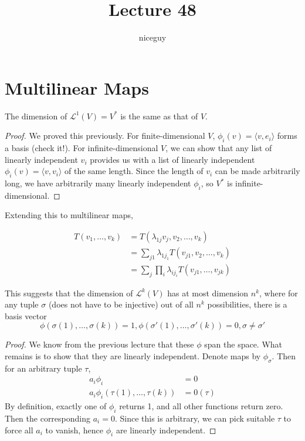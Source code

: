 \documentclass[12pt]{article}
\title{Lecture 48}
\author{niceguy}
\begin{document}
\maketitle

\section{Multilinear Maps}

\begin{lem}
    The dimension of $\mathcal L^1(V) = V^*$ is the same as that of $V$.
\end{lem}

\begin{proof}
    We proved this previously. For finite-dimensional $V$, $\phi_i(v) = \langle v, e_i\rangle$ forms a basis (check it!). For infinite-dimensional $V$, we can show that any list of linearly independent $v_i$ provides us with a list of linearly independent $\phi_i(v) = \langle v, v_i\rangle$ of the same length. Since the length of $v_i$ can be made arbitrarily long, we have arbitrarily many linearly independent $\phi_i$, so $V^*$ is infinite-dimensional.
\end{proof}

Extending this to multilinear maps,

\begin{align*}
    T(v_1,\dots,v_k) &= T(\lambda_{1j}v_j,v_2,\dots,v_k) \\
                     &= \sum_{j1} \lambda_{1j_1} T(v_{j1},v_2,\dots,v_k) \\
                     &= \sum_j \prod_i \lambda_{ij_i} T(v_{j1},\dots,v_{jk})
\end{align*}

This suggests that the dimension of $\mathcal L^k(V)$ has at most dimension $n^k$, where for any tuple $\sigma$ (does not have to be injective) out of all $n^k$ possibilities, there is a basis vector
$$\phi(\sigma(1),\dots,\sigma(k)) = 1, \phi(\sigma'(1),\dots,\sigma'(k)) = 0, \sigma \neq \sigma'$$

\begin{proof}
    We know from the previous lecture that these $\phi$ span the space. What remains is to show that they are linearly independent. Denote maps by $\phi_\sigma$. Then for an arbitrary tuple $\tau$,
    \begin{align*}
        a_i\phi_i &= 0 \\
        a_i\phi_i(\tau(1),\dots,\tau(k)) &= 0(\tau)
    \end{align*}
    By definition, exactly one of $\phi_i$ returns 1, and all other functions return zero. Then the corresponding $a_i = 0$. Since this is arbitrary, we can pick suitable $\tau$ to force all $a_i$ to vanish, hence $\phi_i$ are linearly independent.
\end{proof}
\end{document}
